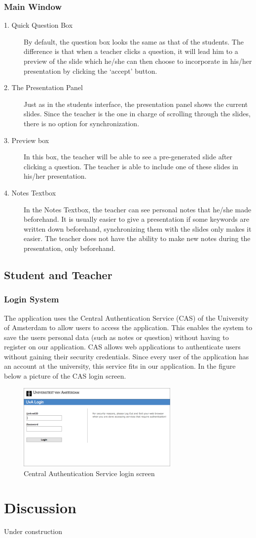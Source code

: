 \documentclass[11pt]{article}
\begin{document}
\subsubsection{Main Window}
\begin{description}
\item[1. Quick Question Box] By default, the question box looks the same as that of the students. The difference is that when a teacher clicks a question, it will lead him to a preview of the slide which he/she can then choose to incorporate in his/her presentation by clicking the `accept’ button. 

\item[2. The Presentation Panel] Just as in the students interface, the presentation panel shows the current slides. Since the teacher is the one in charge of scrolling through the slides, there is no option for synchronization. 

\item[3. Preview box] In this box, the teacher will be able to see a pre-generated slide after clicking a question. The teacher is able to include one of these slides in his/her presentation. 

\item[4. Notes Textbox] In the Notes Textbox, the teacher can see personal notes that he/she made beforehand. It is usually easier to give a presentation if some keywords are written down beforehand, synchronizing them with the slides only makes it easier. The teacher does not have the ability to make new notes during the presentation, only beforehand.
\end{description}
\subsection{Student and Teacher}
\subsubsection{Login System}
The application uses the Central Authentication Service (CAS) of the University of Amsterdam to allow users to access the application. This enables the system to save the users personal data (such as notes or question) without having to register on our application. CAS allows web applications to authenticate users without gaining their security credentials. Since every user of the application has an account at the university, this service fits in our application. In the figure below a picture of the CAS login screen.
\begin{figure}[!h]
\centering
\includegraphics[width=0.7\textwidth]{Cas.png}
\caption{Central Authentication Service login screen}
\end{figure}
\section{Discussion}
Under construction
\end{document}
